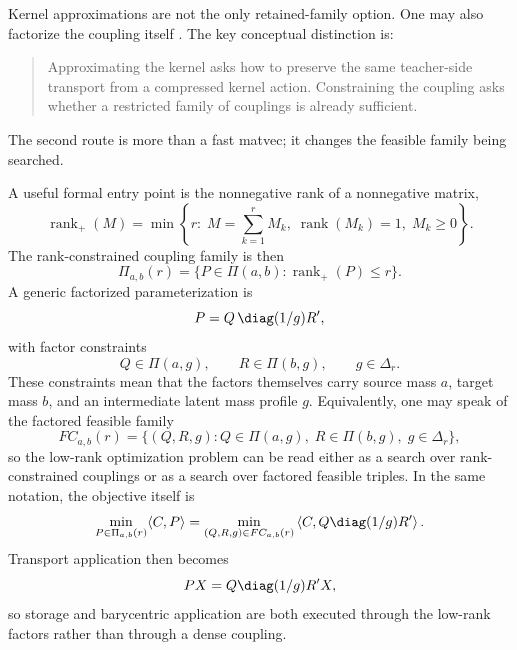 Kernel approximations are not the only retained-family option.  One may also
factorize the coupling itself \citep{forrow2019factored,scetbon2021lowrank,scetbon2022lowrank,scetbon2023unbalanced}.  The key conceptual distinction is:
\begin{quote}
Approximating the kernel asks how to preserve the same teacher-side transport from
a compressed kernel action.  Constraining the coupling asks whether a restricted
family of couplings is already sufficient.
\end{quote}
The second route is more than a fast matvec; it changes the feasible family being
searched.

A useful formal entry point is the nonnegative rank of a nonnegative matrix,
\begin{equation}
\label{eq:bf-learned-ot-nonnegative-rank}
  \operatorname{rank}_{+}(M)
  =
  \min\left\{
  r:\;M=\sum_{k=1}^r M_k,\;
  \operatorname{rank}(M_k)=1,\;M_k\ge0
  \right\}.
\end{equation}
The rank-constrained coupling family is then
\begin{equation}
\label{eq:bf-learned-ot-low-rank-polytope}
  \Pi_{a,b}(r)
  =
  \{P\in\Pi(a,b):\operatorname{rank}_{+}(P)\le r\}.
\end{equation}
A generic factorized parameterization is
\begin{equation}
\label{eq:bf-learned-ot-low-rank-coupling}
  P
  =
  Q\,\diag(1/g)R',
\end{equation}
with factor constraints
\begin{equation}
\label{eq:bf-learned-ot-low-rank-constraints}
  Q\in\Pi(a,g),
  \qquad
  R\in\Pi(b,g),
  \qquad
  g\in\Delta_r.
\end{equation}
These constraints mean that the factors themselves carry source mass \(a\), target
mass \(b\), and an intermediate latent mass profile \(g\).  Equivalently, one may
speak of the factored feasible family
\begin{equation}
\label{eq:bf-learned-ot-low-rank-feasible-family}
  FC_{a,b}(r)
  =
  \{(Q,R,g): Q\in\Pi(a,g),\;R\in\Pi(b,g),\;g\in\Delta_r\},
\end{equation}
so the low-rank optimization problem can be read either as a search over
rank-constrained couplings or as a search over factored feasible triples.  In the
same notation, the objective itself is
\begin{equation}
\label{eq:bf-learned-ot-low-rank-objective}
  \min_{P\in\Pi_{a,b}(r)}\langle C,P\rangle
  =
  \min_{(Q,R,g)\in FC_{a,b}(r)}
  \left\langle C,Q\diag(1/g)R'\right\rangle.
\end{equation}
Transport application
then becomes
\begin{equation}
\label{eq:bf-learned-ot-low-rank-transport}
  PX
  =
  Q\diag(1/g)R'X,
\end{equation}
so storage and barycentric application are both executed through the low-rank
factors rather than through a dense coupling.

